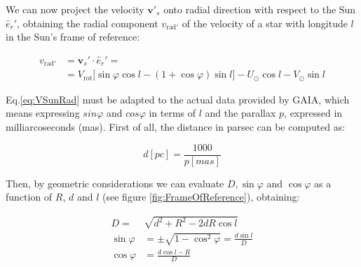 \noindent 
We can now project the velocity $\bm{v'}_s$ onto radial direction with respect to the Sun $\hat{e}_r'$,
obtaining the radial component $v_{\text{rad}'}$ of the velocity of a star with longitude $l$ in the Sun's frame of reference:

\begin{equation}\label{eq:VSunRad}
    \begin{aligned}
        v_{\text{rad}'}  &= \bm{v}_s' \cdot \hat{e}_r' = \\ 
        &=V_{\text{rot}} \biggl[ \sin\varphi \cos l - (1 + \cos\varphi)\sin l \biggr] - U_{\odot} \cos l - V_{\odot} \sin l
    \end{aligned}
\end{equation}
\noindent

Eq.\ref{eq:VSunRad} must be adapted to the actual data provided by GAIA, which means expressing $sin\varphi$ and $cos\varphi$ in terms of $l$ and the parallax $p$, expressed in milliarcoseconds (\unit{mas}). First of all, the distance in parsec can be computed as:

\begin{equation}\label{eq:DistanceParallax}
    d[\unit{pc}] = \frac{1000}{p[\unit{mas}]}
\end{equation}

\noindent
Then, by geometric considerations we can evaluate $D, \sin\varphi$ and $\cos\varphi$ as a function of $R$, $d$ and $l$ (see figure \ref{fig:FrameOfReference}), obtaining:

\begin{equation}\label{eq:Geometry}
    \begin{aligned}
        D=&\sqrt{d^2 + R^2 - 2dR \cos l} \\
        \sin\varphi &= \pm \sqrt{1 - \cos^2 \varphi} = \frac{d\sin l}{D}\\
        \cos\varphi &= \frac{d \cos l - R}{D}
    \end{aligned}
\end{equation}

